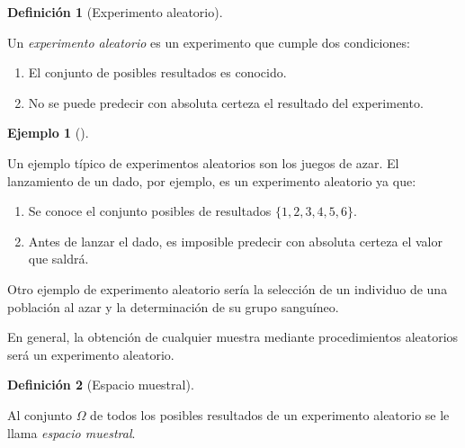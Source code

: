\documentclass[
  spanish,
  a4paper,
]{scrreport}
\providecommand{\tightlist}{%
  \setlength{\itemsep}{0pt}\setlength{\parskip}{0pt}}
\theoremstyle{plain}
\theoremstyle{definition}
\newtheorem{example}{Ejemplo}[chapter]
\theoremstyle{definition}
\newtheorem{definition}{Definición}[chapter]
\theoremstyle{remark}
\begin{document}
\begin{definition}[Experimento
aleatorio]\protect\hypertarget{def-experimento-aleatorio}{}\label{def-experimento-aleatorio}

Un \emph{experimento aleatorio} es un experimento que cumple dos
condiciones:

\begin{enumerate}
\def\labelenumi{\arabic{enumi}.}
\tightlist
\item
  El conjunto de posibles resultados es conocido.
\item
  No se puede predecir con absoluta certeza el resultado del
  experimento.
\end{enumerate}

\end{definition}

\begin{example}[]\protect\hypertarget{exm-experimento-aleatorio}{}\label{exm-experimento-aleatorio}

Un ejemplo típico de experimentos aleatorios son los juegos de azar. El
lanzamiento de un dado, por ejemplo, es un experimento aleatorio ya que:

\begin{enumerate}
\def\labelenumi{\arabic{enumi}.}
\tightlist
\item
  Se conoce el conjunto posibles de resultados \(\{1,2,3,4,5,6\}\).
\item
  Antes de lanzar el dado, es imposible predecir con absoluta certeza el
  valor que saldrá.
\end{enumerate}

Otro ejemplo de experimento aleatorio sería la selección de un individuo
de una población al azar y la determinación de su grupo sanguíneo.

En general, la obtención de cualquier muestra mediante procedimientos
aleatorios será un experimento aleatorio.

\end{example}

\begin{definition}[Espacio
muestral]\protect\hypertarget{def-espacio-muestral}{}\label{def-espacio-muestral}

Al conjunto \(\Omega\) de todos los posibles resultados de un
experimento aleatorio se le llama \emph{espacio muestral}.

\end{definition}
\end{document}
